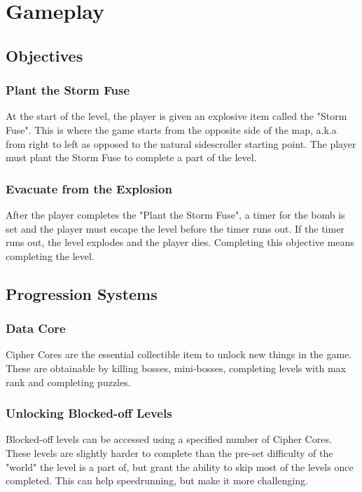 \documentclass[12pt]{article}
\begin{document}
\section{Gameplay}

\subsection{Objectives}

\subsubsection{Plant the Storm Fuse}

At the start of the level, the player is given an explosive item called the "Storm Fuse". This is where the game starts from the  opposite side of the map, a.k.a from right to left as opposed to the natural sidescroller starting point. The player must plant the Storm Fuse to complete a part of the level. 

\subsubsection{Evacuate from the Explosion}

After the player completes the "Plant the Storm Fuse", a timer for the bomb is set and the player must escape the level before the timer runs out. If the timer runs out, the level explodes and the player dies. Completing this objective means completing the level. 

\subsection{Progression Systems}

\subsubsection{Data Core}

Cipher Cores are the essential collectible item to unlock new things in the game. These are obtainable by killing bosses, mini-bosses, completing levels with max rank and completing puzzles. 

\subsubsection{Unlocking Blocked-off Levels}

Blocked-off levels can be accessed using a specified number of Cipher Cores. These levels are slightly harder to complete than the pre-set difficulty of the "world" the level is a part of, but grant the ability to skip most of the levels once completed. This can help speedrunning, but make it more challenging. 
\end{document}
